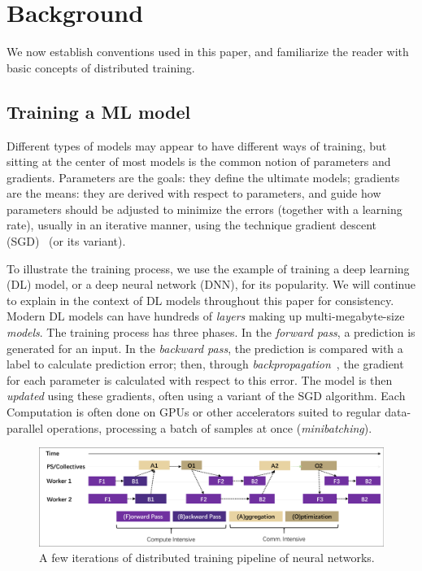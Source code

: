 \section{Background}
We now establish conventions used in this paper, and familiarize the reader with basic concepts of distributed training.


\subsection{Training a ML model}
Different types of models may appear to have different ways of training, but sitting at the center of most models is the common notion of parameters and gradients. Parameters are the goals: they define the ultimate models; gradients are the means: they are derived with respect to parameters, and guide how parameters should be adjusted to minimize the errors (together with a learning rate), usually in an iterative manner, using the technique gradient descent (SGD)~\cite{subgradient,DBLP:journals/corr/Ruder16} (or its variant). 

To illustrate the training process, we use the example of training a deep learning (DL) model, or a deep neural network (DNN), for its popularity. We will continue to explain in the context of DL models throughout this paper for consistency. Modern DL models can have hundreds of \textit{layers} making up multi-megabyte-size \textit{models}. The training process has three phases. In the \textit{forward pass}, a prediction is generated for an input. In the \textit{backward pass}, the prediction is compared with a label to calculate prediction error; then, through \textit{backpropagation}~\cite{backprop}, the gradient for each parameter
is calculated with respect to this error. The model is then \textit{updated} using these gradients, often using a variant of the SGD algorithm. Each Computation is often done on GPUs or other accelerators suited to regular data-parallel operations, processing a batch of samples at once (\textit{minibatching}).

\begin{figure}[t!]
	\centering
	\includegraphics[width=.6\linewidth, trim=2 3 3 3,clip]{Figures/distributedtraining.pdf}
	\caption{A few iterations of distributed training pipeline of neural networks.}
	\label{fig:distributedtraining}
\end{figure}


